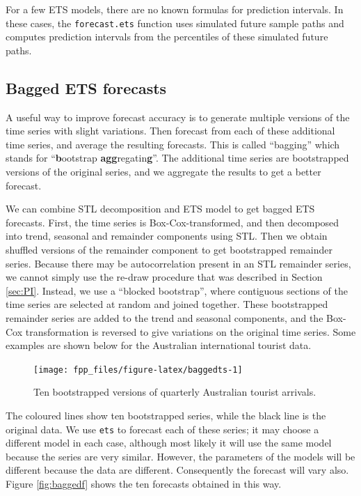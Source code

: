\documentclass[]{book}
\begin{document}
For a few ETS models, there are no known formulas for prediction intervals. In these cases, the \texttt{forecast.ets} function uses simulated future sample paths and computes prediction intervals from the percentiles of these simulated future paths.

\hypertarget{bagged-ets-forecasts}{%
\subsection*{Bagged ETS forecasts}\label{bagged-ets-forecasts}}

A useful way to improve forecast accuracy is to generate multiple versions of the time series with slight variations. Then forecast from each of these additional time series, and average the resulting forecasts. This is called ``bagging'' which stands for ``\textbf{b}ootstrap \textbf{agg}regatin\textbf{g}''. The additional time series are bootstrapped versions of the original series, and we aggregate the results to get a better forecast.

We can combine STL decomposition and ETS model to get bagged ETS forecasts. First, the time series is Box-Cox-transformed, and then decomposed into trend, seasonal and remainder components using STL. Then we obtain shuffled versions of the remainder component to get bootstrapped remainder series. Because there may be autocorrelation present in an STL remainder series, we cannot simply use the re-draw procedure that was described in Section \ref{sec:PI}. Instead, we use a ``blocked bootstrap'', where contiguous sections of the time series are selected at random and joined together. These bootstrapped remainder series are added to the trend and seasonal components, and the Box-Cox transformation is reversed to give variations on the original time series. Some examples are shown below for the Australian international tourist data.

\begin{figure}

{\centering \texttt{[image: fpp\_files/figure-latex/baggedts-1]} 

}

\caption{Ten bootstrapped versions of quarterly Australian tourist arrivals.}\label{fig:baggedts}
\end{figure}

The coloured lines show ten bootstrapped series, while the black line is the original data. We use \texttt{ets} to forecast each of these series; it may choose a different model in each case, although most likely it will use the same model because the series are very similar. However, the parameters of the models will be different because the data are different. Consequently the forecast will vary also. Figure \ref{fig:baggedf} shows the ten forecasts obtained in this way.
\end{document}
